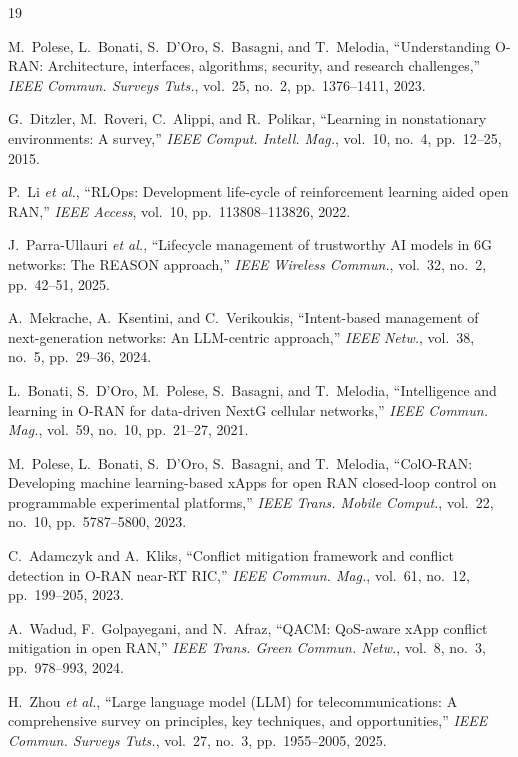 \documentclass[conference]{IEEEtran}
\begin{document}
\begin{thebibliography}{19}

M.~Polese, L.~Bonati, S.~D'Oro, S.~Basagni, and T.~Melodia, ``Understanding O-RAN:
Architecture, interfaces, algorithms, security, and research challenges,'' \emph{IEEE Commun.
Surveys Tuts.}, vol.~25, no.~2, pp.~1376--1411, 2023.

G.~Ditzler, M.~Roveri, C.~Alippi, and R.~Polikar, ``Learning in nonstationary environments: A
survey,'' \emph{IEEE Comput. Intell. Mag.}, vol.~10, no.~4, pp.~12--25, 2015.

P.~Li \emph{et al.}, ``RLOps: Development life-cycle of reinforcement learning aided open RAN,''
\emph{IEEE Access}, vol.~10, pp.~113808--113826, 2022.

J.~Parra-Ullauri \emph{et al.}, ``Lifecycle management of trustworthy AI models in 6G networks:
The REASON approach,'' \emph{IEEE Wireless Commun.}, vol.~32, no.~2, pp.~42--51, 2025.

A.~Mekrache, A.~Ksentini, and C.~Verikoukis, ``Intent-based management of next-generation
networks: An LLM-centric approach,'' \emph{IEEE Netw.}, vol.~38, no.~5, pp.~29--36, 2024.

L.~Bonati, S.~D'Oro, M.~Polese, S.~Basagni, and T.~Melodia, ``Intelligence and learning in
O-RAN for data-driven NextG cellular networks,'' \emph{IEEE Commun. Mag.}, vol.~59, no.~10,
pp.~21--27, 2021.

M.~Polese, L.~Bonati, S.~D'Oro, S.~Basagni, and T.~Melodia, ``ColO-RAN: Developing machine
learning-based xApps for open RAN closed-loop control on programmable experimental platforms,''
\emph{IEEE Trans. Mobile Comput.}, vol.~22, no.~10, pp.~5787--5800, 2023.

C.~Adamczyk and A.~Kliks, ``Conflict mitigation framework and conflict detection in O-RAN
near-RT RIC,'' \emph{IEEE Commun. Mag.}, vol.~61, no.~12, pp.~199--205, 2023.

A.~Wadud, F.~Golpayegani, and N.~Afraz, ``QACM: QoS-aware xApp conflict mitigation in open
RAN,'' \emph{IEEE Trans. Green Commun. Netw.}, vol.~8, no.~3, pp.~978--993, 2024.

H.~Zhou \emph{et al.}, ``Large language model (LLM) for telecommunications: A comprehensive
survey on principles, key techniques, and opportunities,'' \emph{IEEE Commun. Surveys Tuts.},
vol.~27, no.~3, pp.~1955--2005, 2025.


\end{thebibliography}
\end{document}
